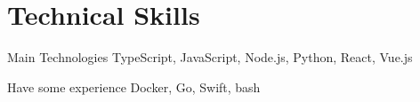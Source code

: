 \section
{Technical Skills}

\cvline
{Main Technologies}
{TypeScript, JavaScript, Node.js, Python, React, Vue.js}

\cvline
{Have some experience}
{Docker, Go, Swift, bash}
